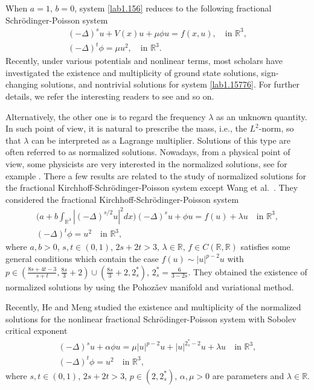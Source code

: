 \documentclass[11pt]{article}
\numberwithin{equation}{section}
\begin{document}
When $a=1$, $b=0$, system \eqref{lab1.156} reduces to the following fractional
Schr\"odinger-Poisson system
\begin{equation}\label{lab1.15776}
\begin{gathered}
(-\Delta)^s u+V(x)u+\mu \phi u= f(x,u),   \quad \text{in }\mathbb{R}^3, \\
(-\Delta)^t \phi=\mu u^2, \quad   \text{in }\mathbb{R}^3.
\end{gathered}
\end{equation}
Recently, under various potentials and nonlinear terms, most scholars have
investigated the existence and multiplicity of ground state  solutions,
sign-changing solutions, and nontrivial solutions for system \eqref{lab1.15776}.
 For further details, we refer  the interesting readers to see
\cite{L1159, D1399, G1312, G1314, P1199} and so on.

Alternatively, the other one is to regard the frequency $\lambda$ as an unknown
quantity. In such point of view, it is natural to prescribe the mass, i.e.,
the $L^2$-norm, so that $\lambda$ can be interpreted as a Lagrange multiplier.
Solutions of this type are often referred to as normalized solutions.
Nowadays, from a physical point of view, some physicists are very interested in the
 normalized solutions, see for example \cite{Bartsch99, luo288,  yang1288}.
There a few results are related to the study of normalized solutions for the
fractional Kirchhoff-Schr\"odinger-Poisson system except Wang et al.\ \cite{wang1388}.
They considered the  fractional Kirchhoff-Schr\"odinger-Poisson system
\[  %
\begin{gathered}
\Big(a+b\int_{\mathbb{R}^3}|(-\Delta)^{s/2}u|^2dx\Big)(-\Delta)^s u+ \phi u= f
(u)+\lambda u    \quad \text{in }\mathbb{R}^3, \\
(-\Delta)^t \phi=u^2 \quad    \text{in }\mathbb{R}^3,
\end{gathered}
\]
where $a,b>0$, $s, t\in (0,1)$, $2s+2t>3$, $\lambda\in \mathbb{R}$,
$f\in C(\mathbb{R}, \mathbb{R})$ satisfies some general conditions which contain
the case  $f(u)\sim|u|^{p-2}u$ with
$p\in(\frac{8s+4t-3}{s+t},\frac{8s}{3}+2)\cup(\frac{8s}{3}+2, 2^*_s)$,
$2^*_s=\frac{6}{3-2s}$. They obtained
the existence of normalized solutions by using the Pohoz\v{a}ev manifold and
variational method.

 Recently, He and Meng \cite{H2588} studied the existence and multiplicity of the
normalized solutions for the nonlinear fractional Schr\"odinger-Poisson system with
Sobolev critical exponent
\[ %
\begin{gathered}
(-\Delta)^s u+ \alpha\phi u= \mu|u|^{p-2}u+|u|^{2^*_s-2}u+\lambda u   \quad
 \text{in }\mathbb{R}^3, \\
(-\Delta)^t \phi=u^2 \quad    \text{in }\mathbb{R}^3,
\end{gathered}
\]
 where $s, t\in (0,1)$, $2s+2t>3$, $p\in(2, 2^*_s)$, $\alpha, \mu>0$ are parameters
and $\lambda\in \mathbb{R}$.
\end{document}
